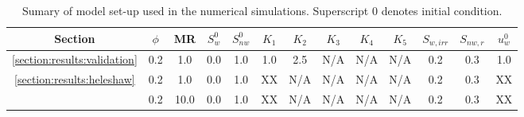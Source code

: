 

\begin{table}
  \begin{tabular}{c | c c  c  c  c  c  c  c  c  c  c   c}
    \hline
      {\bf Section} & $\phi$ & MR  & $S^{0}_{w}$ & $S^{0}_{nw}$ & $K_{1}$ & $K_{2}$ & $K_{3}$ & $K_{4}$ & $K_{5}$ & $S_{w,irr}$ & $S_{nw,r}$ & $u^{0}_{w}$ \\ 
    \hline
      \ref{section:results:validation} & 0.2  & 1.0  & 0.0  & 1.0  & 1.0  & 2.5  & N/A  & N/A  & N/A & 0.2  & 0.3 & 1.0 \\
      \ref{section:results:heleshaw}   & 0.2  & 1.0  & 0.0  & 1.0  &  XX  & N/A  & N/A  & N/A  & N/A & 0.2  & 0.3 & XX  \\
                                       & 0.2  & 10.0 & 0.0  & 1.0  &  XX  & N/A  & N/A  & N/A  & N/A & 0.2  & 0.3 & XX  \\
      \hline
   \end{tabular}
   \caption{Sumary of model set-up used in the numerical simulations. Superscript $0$ denotes initial condition. }
\end{table}
